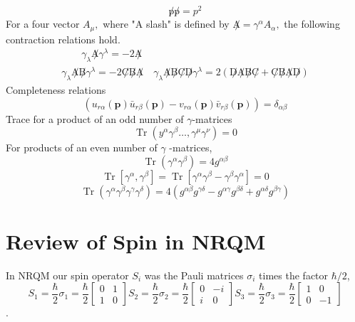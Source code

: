 \begin{equation}
\not p \not p=p^{2}
\end{equation}
For a four vector $A_{\mu},$ where "A slash" is defined by $\not A=\gamma^{\alpha} A_{\alpha},$ the following contraction relations hold.
\begin{equation}
\begin{array}{l}
{\qquad \gamma_{\lambda} \not A \gamma^{\lambda}=-2 \not A} \\
{\gamma_{\lambda} \not A \not B \gamma^{\lambda}=-2 \not C \not B\not A \quad \gamma_{\lambda} \not A\not B\not C\not D\gamma^{\lambda}=2(\not D \not A\not B\not C+\not C \not B \not A \not D)}
\end{array}
\end{equation}
Completeness relations
\begin{equation}
\left(u_{r \alpha}(\mathbf{p}) \bar{u}_{r \beta}(\mathbf{p})-v_{r \alpha}(\mathbf{p}) \bar{v}_{r \beta}(\mathbf{p})\right)=\delta_{\alpha \beta}
\end{equation}
Trace for a product of an odd number of $\gamma$-matrices
\begin{equation}
\operatorname{Tr}\left(y^{\alpha} \gamma^{\beta} \dots, \gamma^{\mu} \gamma^{\nu}\right)=0
\end{equation}
For products of an even number of $\gamma$ -matrices,
$$
\operatorname{Tr}\left(\gamma^{\alpha} \gamma^{\beta}\right)=4 g^{\alpha \beta}
$$
$$
\operatorname{Tr}\left[\gamma^{\alpha}, \gamma^{\beta}\right]=\operatorname{Tr}\left[\gamma^{\alpha} \gamma^{\beta}-\gamma^{\beta} \gamma^{\alpha}\right]=0
$$
$$
\operatorname{Tr}\left(\gamma^{\alpha} \gamma^{\beta} \gamma^{\gamma} \gamma^{\delta}\right)=4\left(g^{\alpha \beta} g^{\gamma \delta}-g^{\alpha \gamma} g^{\beta \delta}+g^{\alpha \delta} g^{\beta \gamma}\right)
$$
\section{Review of Spin in NRQM}
In NRQM our spin operator $S_i$ was the Pauli matrices $\sigma_i$ times the factor $\hbar/2$,
\begin{equation}
S_{1}=\frac{\hbar}{2} \sigma_{1}=\frac{\hbar}{2}\left[\begin{array}{cc}
{0} & {1} \\
{1} & {0}
\end{array}\right] S_{2}=\frac{\hbar}{2} \sigma_{2}=\frac{\hbar}{2}\left[\begin{array}{cc}
{0} & {-i} \\
{i} & {0}
\end{array}\right] S_{3}=\frac{\hbar}{2} \sigma_{3}=\frac{\hbar}{2}\left[\begin{array}{cc}
{1} & {0} \\
{0} & {-1}
\end{array}\right]
\end{equation}
.

